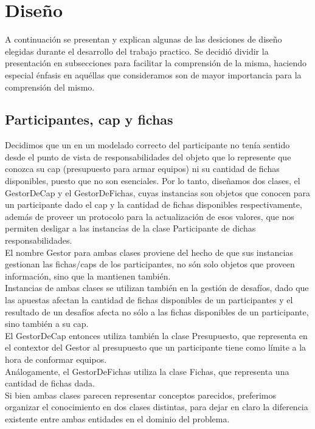 \section{Diseño}
A continuación se presentan y explican algunas de las desiciones de diseño elegidas durante el desarrollo del trabajo practico.
Se decidió dividir la presentación en subsecciones para facilitar la comprensión de la misma, haciendo especial énfasis en aquéllas que consideramos son de mayor importancia para la comprensión del mismo.



\subsection{Participantes, cap y fichas}
Decidimos que un en un modelado correcto del participante no tenía sentido desde el punto de vista de responsabilidades del objeto que lo represente que conozca su cap (presupuesto para armar equipos) ni su cantidad de fichas disponibles, puesto que no son esenciales. Por lo tanto, diseñamos dos clases, el GestorDeCap y el GestorDeFichas, cuyas instancias son objetos que conocen para un participante dado el cap y la cantidad de fichas disponibles respectivamente, además de proveer un protocolo para la actualización de esos valores, que nos permiten desligar a las instancias de la clase Participante de dichas responsabilidades.\\
El nombre Gestor para ambas clases proviene del hecho de que sus instancias gestionan las fichas/caps de los participantes, no són solo objetos que proveen información, sino que la mantienen también.\\
Instancias de ambas clases se utilizan también en la gestión de desafíos, dado que las apuestas afectan la cantidad de fichas disponibles de un participantes y el resultado de un desafíos afecta no sólo a las fichas disponibles de un participante, sino también a su cap.\\
El GestorDeCap entonces utiliza también la clase Presupuesto, que representa en el contextor del Gestor al presupuesto que un participante tiene como límite a la hora de conformar equipos.\\
Análogamente, el GestorDeFichas utiliza la clase Fichas, que representa una cantidad de fichas dada.\\
Si bien ambas clases parecen representar conceptos parecidos, preferimos organizar el conocimiento en dos clases distintas, para dejar en claro la diferencia existente entre ambas entidades en el dominio del problema.\\

